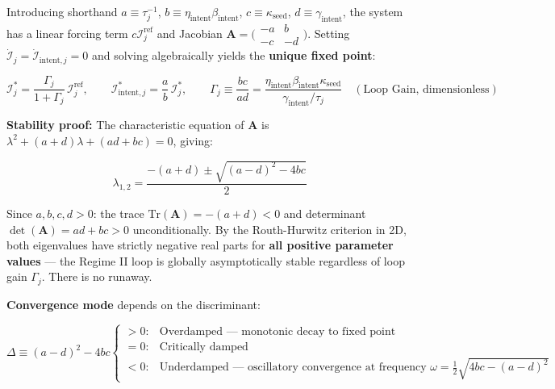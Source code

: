\documentclass[11pt,a4paper]{article}
\theoremstyle{definition}
\theoremstyle{remark}
\begin{document}
Introducing shorthand $a \equiv \tau_j^{-1}$, $b \equiv \eta_{\text{intent}}\beta_{\text{intent}}$, $c \equiv \kappa_{\text{seed}}$, $d \equiv \gamma_{\text{intent}}$, the system has a linear forcing term $c\mathcal{I}_j^{\text{ref}}$ and Jacobian $\mathbf{A} = \bigl(\begin{smallmatrix} -a & b \\ -c & -d \end{smallmatrix}\bigr)$. Setting $\dot{\mathcal{I}}_j = \dot{\mathcal{I}}_{\text{intent},j} = 0$ and solving algebraically yields the \textbf{unique fixed point}:


\begin{equation}
\boxed{\mathcal{I}_j^* = \frac{\Gamma_j}{1 + \Gamma_j}\,\mathcal{I}_j^{\text{ref}}, \qquad \mathcal{I}_{\text{intent},j}^* = \frac{a}{b}\,\mathcal{I}_j^*, \qquad \Gamma_j \equiv \frac{bc}{ad} = \frac{\eta_{\text{intent}}\beta_{\text{intent}}\kappa_{\text{seed}}}{\gamma_{\text{intent}}/\tau_j} \quad (\text{Loop Gain, dimensionless})}
\end{equation}


\textbf{Stability proof:} The characteristic equation of $\mathbf{A}$ is $\lambda^2 + (a+d)\lambda + (ad + bc) = 0$, giving:


\begin{equation}
\lambda_{1,2} = \frac{-(a+d) \pm \sqrt{(a-d)^2 - 4bc}}{2}
\end{equation}


Since $a, b, c, d > 0$: the trace $\mathrm{Tr}(\mathbf{A}) = -(a+d) < 0$ and determinant $\det(\mathbf{A}) = ad + bc > 0$ unconditionally. By the Routh-Hurwitz criterion in 2D, both eigenvalues have strictly negative real parts for \textbf{all positive parameter values} — the Regime II loop is globally asymptotically stable regardless of loop gain $\Gamma_j$. There is no runaway.

\textbf{Convergence mode} depends on the discriminant:


\begin{equation}
\boxed{\Delta \equiv (a-d)^2 - 4bc \begin{cases} > 0: & \text{Overdamped — monotonic decay to fixed point} \\ = 0: & \text{Critically damped} \\ < 0: & \text{Underdamped — oscillatory convergence at frequency } \omega = \tfrac{1}{2}\sqrt{4bc - (a-d)^2} \end{cases}}
\end{equation}
\end{document}
